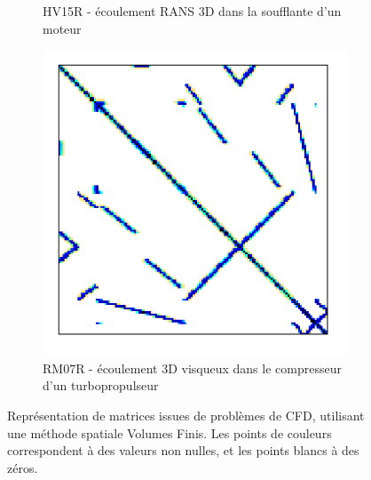 \begin{figure}
\begin{subfigure}[t]{0.3\textwidth}
			\caption{HV15R - écoulement RANS 3D dans la soufflante d'un moteur}
			\label{fig:sparse.HV15R}
		\end{subfigure}
		\hfill
		\begin{subfigure}[t]{0.3\textwidth}
			\centering
			\includegraphics[width=\textwidth]{images/RM07R.png}
			\caption{RM07R - écoulement 3D visqueux dans le compresseur d'un turbopropulseur}
			\label{fig:sparse.RM07R}
		\end{subfigure}
		\caption{Représentation de matrices issues de problèmes de CFD, utilisant une méthode spatiale Volumes Finis\cite{PacullAubertBuisson2011}. Les points de couleurs correspondent à des valeurs non nulles, et les points blancs à des zéros.}
		\label{fig:sparse}
	\end{figure}



